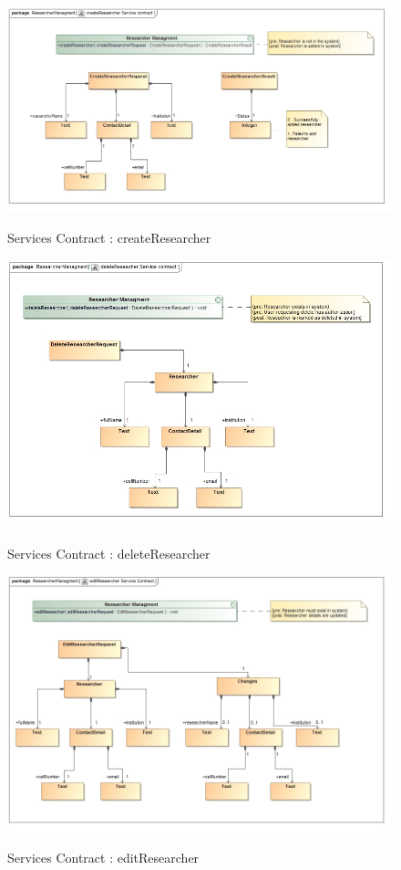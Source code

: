 \documentclass{article}
\begin{document}
		\begin{figure}[H]
			\includegraphics[width=\textwidth]{Rohan_Diagrams/createResearcherServiceContract.jpg}  \\
			\caption{Services Contract : createResearcher}
		\end{figure}
		\begin{figure}[H]
			\includegraphics[width=\textwidth]{Rohan_Diagrams/deleteReseacherServiceContract.jpg}  \\
			\caption{Services Contract : deleteResearcher}
		\end{figure}
		\begin{figure}[H]
			\includegraphics[width=\textwidth]{Rohan_Diagrams/editResearcherServiceContract.jpg}  \\
			\caption{Services Contract : editResearcher}
		\end{figure}
\end{document}
